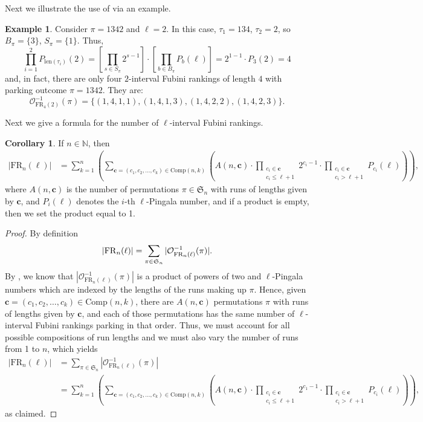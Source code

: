 \documentclass{amsart}
\theoremstyle{definition}
\newtheorem{corollary}{Corollary}[section]
\newtheorem{example}{Example}[section]
\theoremstyle{definition}
\theoremstyle{remark}
\newcommand{\NN}{\mathbb{N}}
\newcommand{\FR}[1]{\mathrm{FR}_{#1}}
\newcommand{\out}{\mathcal{O}}
\newcommand{\len}{\mathrm{len}}
\newcommand{\Comp}{\mathrm{Comp}}
\newcommand{\Sym}{\mathfrak{S}}
\begin{document}
Next we illustrate the use of  via an example.

\begin{example}
    Consider $\pi = 1342$ and $\ell = 2$. In this case, $\tau_1 = 1  3  4$, $\tau_2 = 2$, so $B_\pi = \{3\}$, $S_\pi = \{1\}$. Thus,
    \[\prod_{i=1}^2P_{\len(\tau_i)}(2)=\left[\prod_{s \in S_\pi} 2^{s-1} \right]\cdot\left[\prod_{b \in B_\pi} P_{b}(\ell)\right]= 2^{1-1} \cdot   P_3(2) = 4\]
    and, in fact, there are only four $2$-interval Fubini rankings of length $4$ with  parking outcome $\pi=1342$. They are:
    \[\out_{\FR{4}(2)}^{-1}(\pi)=\{(1,4,1,1),(1,4,1,3), (1,4,2,2), (1,4,2,3)\}.\]
\end{example}
Next we give a formula for the number of $\ell$-interval Fubini rankings.

\begin{corollary}\label{cor:formula for ell fubini using compositions}
     If $n\in \NN$, then 
     \begin{align}
     |\FR{n}(\ell)|
     &= \sum_{k=1}^{n}\left(\sum_{\textbf{c}=(c_1,c_2,\ldots,c_k)\in\Comp(n,k)}\left(A(n,\textbf{c})\cdot\prod_{\substack{c_i\in \textbf{c} \\ c_i\leq \ell+1}}2^{c_i-1}\cdot\prod_{\substack{c_i\in \textbf{c}\\c_i>\ell+1}}P_{c_i}(\ell)\right)\right),
     \end{align}
     where $A(n,\textbf{c})$ is the number of permutations $\pi\in\Sym_n$ with runs of lengths given by $\textbf{c}$, and $P_i(\ell)$ denotes the $i$-th $\ell$-Pingala number, and if a product is empty, then we set the product equal to 1.
\end{corollary}
\begin{proof}
By definition 
\begin{equation}
    |\FR{n}(\ell)|=\sum_{\pi\in\Sym_n}|\out_{\FR{n}(\ell)}^{-1}(\pi)|.\notag
\end{equation}
By , we know that $|\out_{\FR{n}(\ell)}^{-1}(\pi)|$ is a product of powers of two and $\ell$-Pingala numbers which are indexed by the lengths of the runs making up $\pi$.
Hence, given $\textbf{c}=(c_1,c_2,\ldots,c_k)\in\Comp(n,k)$,  there are $A(n,\textbf{c})$ permutations $\pi$ with runs of lengths given by $\textbf{c}$, and each of those permutations has the same number of $\ell$-interval Fubini rankings parking in that order. 
Thus, we must account for all possible compositions of run lengths and we must also vary the number of runs from 1 to $n$, which yields
\begin{align*}
|\FR{n}(\ell)|&=\sum_{\pi\in\Sym_n}|\out_{\FR{n}(\ell)}^{-1}(\pi)|\\
&=\sum_{k=1}^{n}\left(\sum_{\textbf{c}=(c_1,c_2,\ldots,c_k)\in\Comp(n,k)}\left(A(n,\textbf{c})\cdot\prod_{\substack{c_i\in \textbf{c}\\c_i\leq \ell+1}}2^{c_1-1}\cdot\prod_{\substack{c_i\in \textbf{c}\\c_i> \ell+1}}P_{c_i}(\ell)\right)\right),
\end{align*}
as claimed.
\end{proof}
\end{document}
